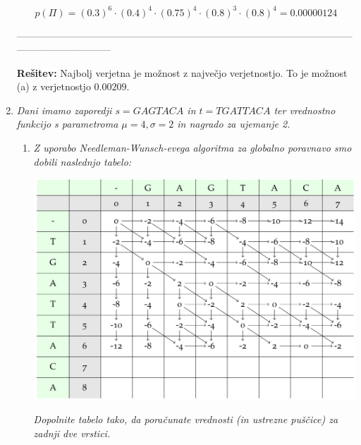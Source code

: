 \documentclass{article}
\begin{document}
\begin{enumerate}
\begin{center}
				$$
				p(\Pi) = (0.3)^6 \cdot (0.4)^4 \cdot (0.75)^4 \cdot (0.8)^3 \cdot (0.8)^4 = 0.00000124
				$$
			\end{center}

			-----------------------------------------------------------------------------------------------------------------------------------

		\textbf{Rešitev:} Najbolj verjetna je možnost z največjo verjetnostjo. To je možnost (a)
		z verjetnostjo $0.00209$.

		\newpage

	\item \textit{Dani imamo zaporedji $s=GAGTACA$ in $t=TGATTACA$ ter vrednostno funkcijo s parametroma
		$\mu = 4, \sigma = 2$ in nagrado za ujemanje 2.}

		\begin{enumerate}
			\item \textit{Z uporabo Needleman-Wunsch-evega algoritma za globalno poravnavo smo dobili
				naslednjo tabelo:}

				\begin{center}
					\includegraphics[scale=0.17]{NW-tabela.png}
				\end{center}

				\textit{Dopolnite tabelo tako, da poračunate vrednosti (in ustrezne puščice) za zadnji dve vrstici.}


\end{enumerate}
\end{enumerate}
\end{document}
